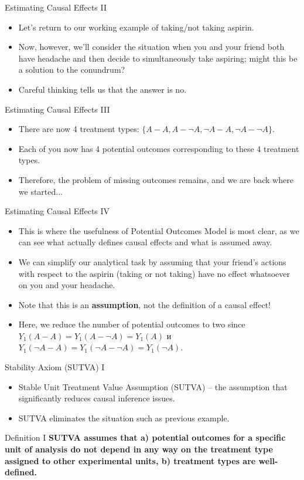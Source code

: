 \documentclass{beamer}
\begin{document}
\begin{frame}{Estimating Causal Effects II}
\begin{itemize}
	\setlength\itemsep{2em}
	\item Let's return to our working example of taking/not taking aspirin.
	\item Now, however, we'll consider the situation when you and your friend both have headache and then decide to simultaneously take aspiring; might this be a solution to the conundrum? 
	\item Careful thinking tells us that the answer is no. 
\end{itemize}
\end{frame}
\begin{frame}{Estimating Causal Effects III}
\begin{itemize}
	\setlength\itemsep{2em}
	\item There are now 4 treatment types: $\{A - A, A - \neg A, \neg A - A, \neg A - \neg A\}$. 
	\item Each of you now has 4 potential outcomes corresponding to these 4 treatment types.
	\item Therefore, the problem of missing outcomes remains, and we are back where we started...
\end{itemize}
\end{frame}
\begin{frame}{Estimating Causal Effects IV}
\begin{itemize}
	\setlength\itemsep{1em}
	\item This is where the usefulness of Potential Outcomes Model is most clear, as we can see what actually defines causal effects and what is assumed away. 
	\item We can simplify our analytical task by assuming that your friend's actions with respect to the aspirin (taking or not taking) have no effect whatsoever on you and your headache.
	\item Note that this is an \textbf{assumption}, not the definition of a causal effect!
	\item Here, we reduce the number of potential outcomes to two since $Y_1(A - A) = Y_1(A - \neg A) = Y_1(A)$ и $Y_1(\neg A - A) = Y_1(\neg A - \neg A) = Y_1(\neg A)$.
\end{itemize}
\end{frame}
\begin{frame}{Stability Axiom (SUTVA) I}
\begin{itemize}
	\setlength\itemsep{1em}
	\item Stable Unit Treatment Value Assumption (SUTVA) -- the assumption that significantly reduces causal inference issues. 
	\item SUTVA eliminates the situation such as previous example. 
\end{itemize}
\begin{block}{Definition I}
\textbf{SUTVA assumes that a) potential outcomes for a specific unit of analysis do not depend in any way on the treatment type assigned to other experimental units, b) treatment types are well-defined.}
\end{block}
\end{frame}
\end{document}
